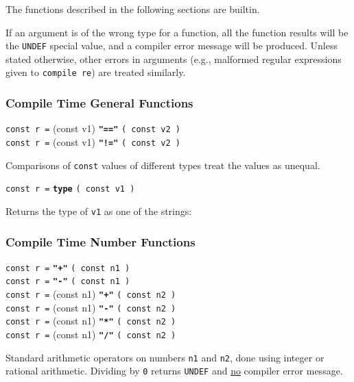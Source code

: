 \documentclass[12pt]{article}
\newcommand{\ttkey}[1]{{\tt \bfseries #1}}
\newenvironment{indpar}[1][0.3in]%
	{\begin{list}{}%
		     {\setlength{\itemsep}{0in}%
		      \setlength{\topsep}{0in}%
		      \setlength{\parsep}{1ex}%
		      \setlength{\labelwidth}{#1}%
		      \setlength{\leftmargin}{#1}%
		      \addtolength{\leftmargin}{\labelsep}}%
	 \item}%
	{\end{list}}
\begin{document}
The functions described in the following sections are builtin.

If an argument is of the wrong type for a function, all the
function results will be the {\tt UNDEF} special value, and
a compiler error message will be produced.  Unless stated
otherwise, other errors in arguments (e.g., malformed
regular expressions given to {\tt compile re}) are treated
similarly.

\subsubsection{Compile Time General Functions}

{\tt const r =} (const v1) \ttkey{"=="} {\tt ( const v2 )} \\
{\tt const r =} (const v1) \ttkey{"!="} {\tt ( const v2 )}
\begin{indpar}
Comparisons of {\tt const} values of different types treat
the values as unequal.
\end{indpar}

{\tt const r =} \ttkey{type} {\tt ( const v1 )}
\begin{indpar}
Returns the type of {\tt v1} as one of the strings: \\
\hspace*{0.5in}{\tt
"special" ~  "integer" ~ "rational" ~ "string" ~ \tt "map"}
\end{indpar}


\subsubsection{Compile Time Number Functions}

{\tt const r =} \ttkey{"+"} {\tt ( const n1 )} \\
{\tt const r =} \ttkey{"-"} {\tt ( const n1 )} \\
{\tt const r =} (const n1) \ttkey{"+"} {\tt ( const n2 )} \\
{\tt const r =} (const n1) \ttkey{"-"} {\tt ( const n2 )} \\
{\tt const r =} (const n1) \ttkey{"*"} {\tt ( const n2 )} \\
{\tt const r =} (const n1) \ttkey{"/"} {\tt ( const n2 )}
\begin{indpar}
Standard arithmetic operators on numbers {\tt n1} and {\tt n2},
done using integer or rational arithmetic.  Dividing by {\tt 0}
returns {\tt UNDEF} and \underline{no} compiler error message.
\end{indpar}
\end{document}
